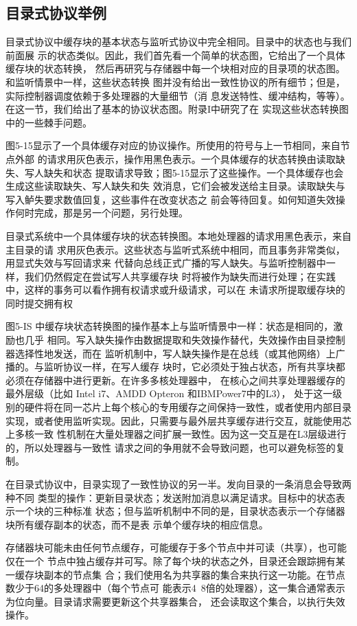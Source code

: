 \subsection{目录式协议举例}
目录式协议中缓存块的基本状态与监听式协议中完全相同。目录中的状态也与我们前面展
示的状态类似。因此，我们首先看一个简单的状态图，它给出了一个具体缓存块的状态转换，
然后再研究与存储器中每一个块相对应的目录项的状态图。和监听情景中一样，这些状态转换
图并没有给出一致性协议的所有细节；但是，实际控制器调度依赖于多处理器的大量细节（消
息发送特性、缓冲结构，等等）。在这一节，我们给出了基本的协议状态图。附录I中研究了在
实现这些状态转换图中的一些棘手问题。

图5-15显示了一个具体缓存对应的协议操作。所使用的符号与上一节相同，来自节点外部
的请求用灰色表示，操作用黑色表示。一个具体缓存的状态转换由读取缺失、写人缺失和状态
提取请求导致；图5-15显示了这些操作。一个具体缓存也会生成这些读取缺失、写人缺失和失
效消息，它们会被发送给主目录。读取缺失与写入鲈失要求数值回复，这些事件在改变状态之
前会等待回复。如何知道失效操作何时完成，那是另一个问题，另行处理。

目录式系统中一个具体缓存块的状态转换图。本地处理器的请求用黑色表示，来自主目录的请
求用灰色表示。这些状态与监听式系统中相同，而且事务非常类似，用显式失效与写回请求来
代替向总线正式广播的写人缺失。与监听控制器中一样，我们仍然假定在尝试写人共享缓存块
时将被作为缺失而进行处理；在实践中，这样的事务可以看作拥有权请求或升级请求，可以在
未请求所提取缓存块的同时提交拥有权

图5-IS 中缓存块状态转换图的操作基本上与监听情景中一样：状态是相同的，激励也几乎
相同。写入缺失操作由数据提取和失效操作替代，失效操作由目录控制器选择性地发送，而在
监听机制中，写人缺失操作是在总线（或其他网络）上广播的。与监听协议一样，在写人缓存
块时，它必须处于独占状态，所有共享块都必须在存储器中进行更新。在许多多核处理器中，
在核心之间共享处理器缓存的最外层级（比如 Intel i7、AMDD Opteron 和IBMPower7中的L3），
处于这一级别的硬件将在同一芯片上每个核心的专用缓存之间保持一致性，或者使用内部目录
实现，或者使用监听实现。因此，只需要与最外层共享缓存进行交互，就能使用芯上多核一致
性机制在大量处理器之间扩展一致性。因为这一交互是在L3层级进行的，所以处理器与一致性
请求之间的争用就不会导致问题，也可以避免标签的复制。

在目录式协议中，目录实现了一致性协议的另一半。发向目录的一条消息会导致两种不同
类型的操作：更新目录状态；发送附加消息以满足请求。目标中的状态表示一个块的三种标准
状态；但与监听机制中不同的是，目录状态表示一个存储器块所有缓存副本的状态，而不是表
示单个缓存块的相应信息。

存储器块可能未由任何节点缓存，可能缓存于多个节点中并可读（共享），也可能仅在一个
节点中独占缓存并可写。除了每个块的状态之外，目录还会跟踪拥有某一缓存块副本的节点集
合；我们使用名为共享器的集合来执行这一功能。在节点数少于64的多处理器中（每个节点可
能表示4~8倍的处理器），这一集合通常表示为位向量。目录请求需要更新这个共享器集合，
还会读取这个集合，以执行失效操作。

